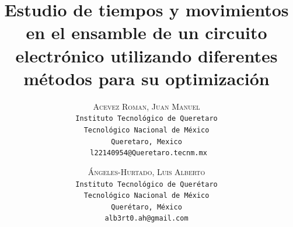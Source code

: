     \lfoot{ \thepage}
    
    \setlength{\droptitle}{-5\baselineskip} %
    \title{\textbf{Estudio de tiempos y movimientos en el ensamble de un circuito electrónico utilizando diferentes métodos para su optimización }} %
    
     \author{ 
     \textsc{Acevez Roman, Juan Manuel}\\ 
     \texttt{ Instituto Tecnológico de Queretaro } \\ 
     \texttt{ Tecnológico Nacional de México } \\ 
     \texttt{ Queretaro, Mexico }\\ 
     \texttt{ l22140954@Queretaro.tecnm.mx} 
     \and 
     \textsc{Ángeles-Hurtado, Luis Alberto}\\ 
     \texttt{ Instituto Tecnológico de Querétaro } \\ 
     \texttt{ Tecnológico Nacional de México } \\ 
     \texttt{Querétaro, México}\\ 
     \texttt{alb3rt0.ah@gmail.com} 
    }
    
    
    
    
